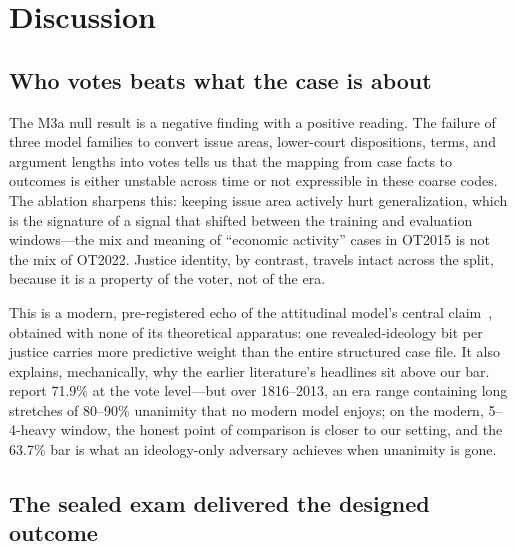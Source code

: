 \section{Discussion}\label{sec:discussion}

\subsection{Who votes beats what the case is about}

The M3a null result is a negative finding with a positive reading.
The failure of three model families to convert issue areas,
lower-court dispositions, terms, and argument lengths into votes
tells us that the mapping from case facts to outcomes is either
unstable across time or not expressible in these coarse codes. The
ablation sharpens this: keeping issue area actively hurt
generalization, which is the signature of a signal that shifted
between the training and evaluation windows---the mix and meaning
of ``economic activity'' cases in OT2015 is not the mix of OT2022.
Justice identity, by contrast, travels intact across the split,
because it is a property of the voter, not of the era.

This is a modern, pre-registered echo of the attitudinal model's
central claim~\citep{segal2002}, obtained with none of its
theoretical apparatus: one revealed-ideology bit per justice
carries more predictive weight than the entire structured case
file. It also explains, mechanically, why the earlier literature's
headlines sit above our bar. \citet{katz2017} report 71.9\% at the
vote level---but over 1816--2013, an era range containing long
stretches of 80--90\% unanimity that no modern model enjoys; on the
modern, 5--4-heavy window, the honest point of comparison is
closer to our setting, and the 63.7\% bar is what an
ideology-only adversary achieves when unanimity is gone.

\subsection{The sealed exam delivered the designed outcome}

